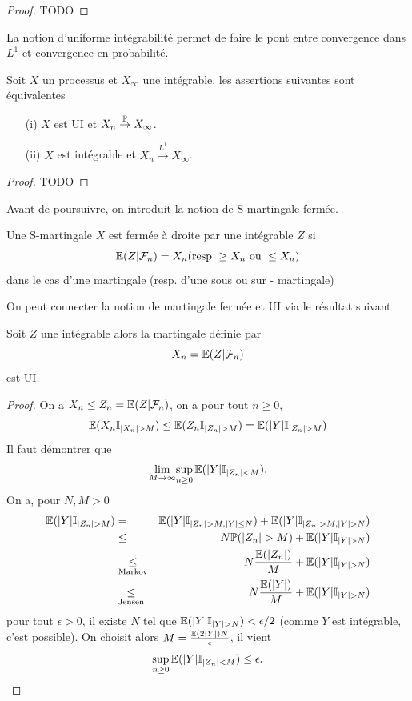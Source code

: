 \begin{proof}
TODO
\end{proof}
La notion d'uniforme intégrabilité permet de faire le pont entre convergence dans $L^1$ et convergence en probabilité. 
\begin{theo}
Soit $X$ un processus et $X_\infty$ une \va intégrable, les assertions suivantes sont équivalentes
\begin{itemize}
    \item[(i)] $X$ est UI et $X_n\overset{\mathbb{P}}{\rightarrow} X_{\infty}$. 
    \item[(ii)] $X$ est intégrable et $X_n\overset{L^1}{\rightarrow} X_{\infty}$. 
\end{itemize}
\end{theo}
\begin{proof}
TODO
\end{proof}
Avant de poursuivre, on introduit la notion de S-martingale fermée.
\begin{definition}
Une S-martingale $X$ est fermée à droite par une \va intégrable $Z$ si 
$$
\mathbb{E}(Z|\mathcal{F}_n)= X_n (\text{resp }\geq X_n\text{ ou }\leq X_n) 
$$
dans le cas d'une martingale (resp. d'une sous ou sur - martingale)
\end{definition}
On peut connecter la notion de martingale fermée et UI via le résultat suivant 
\begin{prop}
Soit $Z$ une \va intégrable alors la martingale définie par 
$$
X_n  = \mathbb{E}(Z|\mathcal{F}_n)
$$
est UI. 
\end{prop}
\begin{proof}
On a $X_n \leq Z_n  = \mathbb{E}(Z|\mathcal{F}_n)$, on a pour tout $n\geq 0$, 
$$
\E(X_n\mathbb{I}_{|X_n|>M})\leq \E(Z_n\mathbb{I}_{|Z_n|>M}) = \E(|Y|\mathbb{I}_{|Z_n|>M})
$$
Il faut démontrer que 
$$
\underset{M\rightarrow \infty}{\lim}\underset{n\geq 0}{\sup}\,\mathbb{E}(|Y|\mathbb{I}_{|Z_n|<M}).
$$
On a, pour $N, M>0$ 
\begin{eqnarray*}
\E(|Y|\mathbb{I}_{|Z_n|>M})&=& \E(|Y|\mathbb{I}_{|Z_n|>M, |Y|\leq N}) + \E(|Y|\mathbb{I}_{|Z_n|>M, |Y|> N})\\
&\leq& N \Prob(|Z_n|>M) + \E(|Y|\mathbb{I}_{|Y|> N})\\
&\underset{\text{Markov}}{\leq}& N\frac{\E(|Z_n|)}{M} + \E(|Y|\mathbb{I}_{|Y|> N})\\
&\underset{\text{Jensen}}{\leq}& N\frac{\E(|Y|)}{M} + \E(|Y|\mathbb{I}_{|Y|> N})\\
\end{eqnarray*}
pour tout $\epsilon >0$, il existe $N$ tel que $\E(|Y|\mathbb{I}_{|Y|> N})<\epsilon / 2$ (comme $Y$ est intégrable, c'est possible). On choisit alors $M =\frac{\mathbb{E}(2|Y|)N}{\epsilon}$, il vient 
$$
\underset{n\geq 0}{\sup}\,\mathbb{E}(|Y|\mathbb{I}_{|Z_n|<M})\leq \epsilon.
$$
\end{proof}
